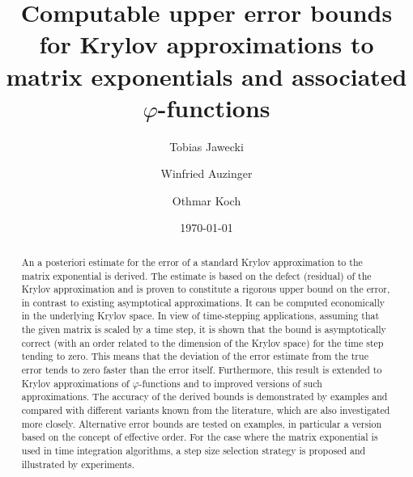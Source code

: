 \documentclass[smallextended]{svjour3pre}%
\date{\today}
\numberwithin{equation}{section}
\numberwithin{figure}{section}
\numberwithin{table}{section}
\newcommand\tjnew[1]{{#1}}
\newcommand\phif\varphi
\begin{document}
\sloppy
\title{Computable upper error bounds
       for Krylov approximations to matrix exponentials
       and associated $ \phif $-functions}
\author{Tobias Jawecki \and Winfried Auzinger \and Othmar Koch}

\maketitle

\begin{abstract}
An a posteriori estimate for the error of a standard Krylov approximation
to the \tjnew{matrix exponential} is derived.
\tjnew{The estimate is based on the defect (residual) of the Krylov approximation and
is proven to constitute a rigorous upper bound on the error,
in contrast to existing asymptotical approximations.}
It can be computed economically in the underlying Krylov space.
In view of time-stepping applications, assuming that
the given matrix is scaled by a time step, it is shown that
the bound is asymptotically correct (with an order related to the
dimension of the Krylov space) for the time step tending to zero.
\tjnew{This means that the deviation of the error estimate from the true error
tends to zero faster than the error itself. }
Furthermore, this result is extended to
Krylov approximations of $ \phif $-functions
and to improved versions of such approximations.
The accuracy of the derived bounds is demonstrated by examples
and compared with different variants known from the literature,
which are also investigated more closely.
Alternative error bounds are tested on examples, in particular
a version based on the concept of effective order.
For the case where the matrix exponential is used
in time integration algorithms, a step size selection
strategy is proposed and illustrated by experiments. 
\end{abstract}
\end{document}
